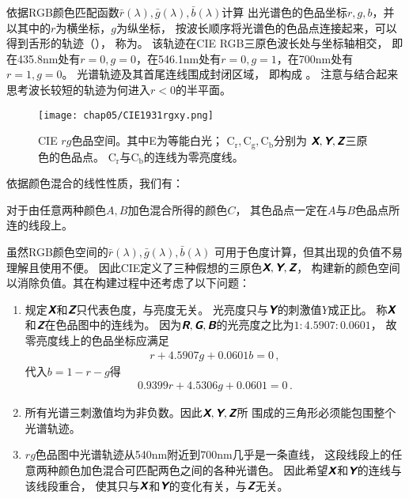 依据RGB颜色匹配函数$\bar{r}(\lambda),\bar{g}(\lambda),\bar{b}(\lambda)$计算
出光谱色的色品坐标$r,g,b$，并以其中的$r$为横坐标，$g$为纵坐标，
按波长顺序将光谱色的色品点连接起来，可以得到舌形的轨迹（），
称为。
该轨迹在CIE RGB三原色波长处与坐标轴相交，
即在435.8nm处有$r=0,g=0$，在546.1nm处有$r=0,g=1$，在700nm处有$r=1,g=0$。
光谱轨迹及其首尾连线围成封闭区域，
即构成
。
注意与结合起来思考波长较短的轨迹为何进入$r<0$的半平面。
\begin{figure}[htbp]
      \centering\texttt{[image: chap05/CIE1931rgxy.png]}
      \caption{CIE $rg$色品空间。其中E为等能白光；
      $\text{C}_{\mathrm{r}},\text{C}_{\mathrm{g}},\text{C}_{\mathrm{b}}$分别为
      $\text{\itshape\sffamily\bfseries X},\text{\itshape\sffamily\bfseries Y},\text{\itshape\sffamily\bfseries Z}$三原色的色品点。
      $\text{C}_{\mathrm{r}}$与$\text{C}_{\mathrm{b}}$的连线为零亮度线。}
      \label{fig:5.ex09}
\end{figure}

依据颜色混合的线性性质，我们有：
\begin{corollary}
      对于由任意两种颜色$A,B$加色混合所得的颜色$C$，
      其色品点一定在$A$与$B$色品点所连的线段上。
\end{corollary}

虽然RGB颜色空间的$\bar{r}(\lambda),\bar{g}(\lambda),\bar{b}(\lambda)$
可用于色度计算，但其出现的负值不易理解且使用不便。
因此CIE定义了三种假想的三原色$\text{\itshape\sffamily\bfseries X},\text{\itshape\sffamily\bfseries Y},\text{\itshape\sffamily\bfseries Z}$，
构建新的颜色空间以消除负值。其在构建过程中还考虑了以下问题：
\begin{enumerate}
      \item 规定$\text{\itshape\sffamily\bfseries X}$和$\text{\itshape\sffamily\bfseries Z}$只代表色度，与亮度无关。
            光亮度只与$\text{\itshape\sffamily\bfseries Y}$的刺激值$Y$成正比。
            称$\text{\itshape\sffamily\bfseries X}$和$\text{\itshape\sffamily\bfseries Z}$在色品图中的连线为。
            因为$\text{\itshape\sffamily\bfseries R},\text{\itshape\sffamily\bfseries G},\text{\itshape\sffamily\bfseries B}$的光亮度之比为$1:4.5907:0.0601$，
            故零亮度线上的色品坐标应满足
            \begin{align}
                  r+4.5907g+0.0601b=0\, ,
            \end{align}
            代入$b=1-r-g$得
            \begin{align}
                  0.9399r+4.5306g+0.0601=0\, .
            \end{align}
      \item 所有光谱三刺激值均为非负数。因此$\text{\itshape\sffamily\bfseries X},\text{\itshape\sffamily\bfseries Y},\text{\itshape\sffamily\bfseries Z}$所
            围成的三角形必须能包围整个光谱轨迹。
      \item $rg$色品图中光谱轨迹从540nm附近到700nm几乎是一条直线，
            这段线段上的任意两种颜色加色混合可匹配两色之间的各种光谱色。
            因此希望$\text{\itshape\sffamily\bfseries X}$和$\text{\itshape\sffamily\bfseries Y}$的连线与该线段重合，
            使其只与$\text{\itshape\sffamily\bfseries X}$和$\text{\itshape\sffamily\bfseries Y}$的变化有关，与$\text{\itshape\sffamily\bfseries Z}$无关。
\end{enumerate}

